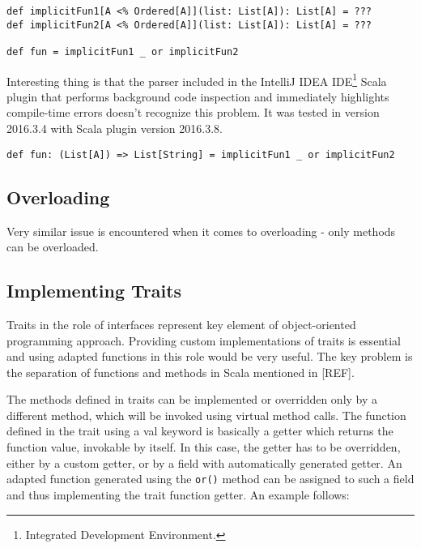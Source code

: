 \lstset{style=Scala}
\begin{lstlisting}
def implicitFun1[A <% Ordered[A]](list: List[A]): List[A] = ???
def implicitFun2[A <% Ordered[A]](list: List[A]): List[A] = ???

def fun = implicitFun1 _ or implicitFun2
\end{lstlisting}

Interesting thing is that the parser included in the IntelliJ IDEA IDE\footnote{Integrated Development Environment.} Scala plugin that performs background code inspection and immediately highlights compile-time errors doesn't recognize this problem. It was tested in version 2016.3.4 with Scala plugin version 2016.3.8.


\lstset{style=Scala}
\begin{lstlisting}
def fun: (List[A]) => List[String] = implicitFun1 _ or implicitFun2
\end{lstlisting}


\subsection{Overloading}
Very similar issue is encountered when it comes to overloading - only methods can be overloaded.

\subsection{Implementing Traits}
Traits in the role of interfaces represent key element of object-oriented programming approach. Providing custom implementations of traits is essential and using adapted functions in this role would be very useful. The key problem is the separation of functions and methods in Scala mentioned in [REF].

The methods defined in traits can be implemented or overridden only by a different method, which will be invoked using virtual method calls. The function defined in the trait using a val keyword is basically a getter which returns the function value, invokable by itself. In this case, the getter has to be overridden, either by a custom getter, or by a field with automatically generated getter. An adapted function generated using the \lstinline|or()| method can be assigned to such a field and thus implementing the trait function getter. An example follows:

